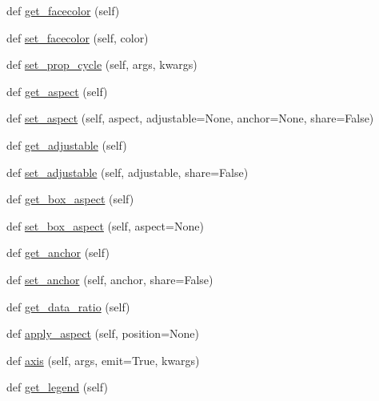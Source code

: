 \begin{DoxyCompactItemize}
def \hyperlink{classmatplotlib_1_1axes_1_1__base_1_1__AxesBase_a0e130f5d753b4ef50d33f100ec6fb068}{get\+\_\+facecolor} (self)
\item 
def \hyperlink{classmatplotlib_1_1axes_1_1__base_1_1__AxesBase_a1a87d87214f7cddc8ad8939687335a36}{set\+\_\+facecolor} (self, color)
\item 
def \hyperlink{classmatplotlib_1_1axes_1_1__base_1_1__AxesBase_a6017bb9ef43c8fea5e1ea371b12c49f0}{set\+\_\+prop\+\_\+cycle} (self, args, kwargs)
\item 
def \hyperlink{classmatplotlib_1_1axes_1_1__base_1_1__AxesBase_ae9d1763aa72778abe0791b26b1091f08}{get\+\_\+aspect} (self)
\item 
def \hyperlink{classmatplotlib_1_1axes_1_1__base_1_1__AxesBase_acab77334c3a0b4d7259b924ca5c83158}{set\+\_\+aspect} (self, aspect, adjustable=None, anchor=None, share=False)
\item 
def \hyperlink{classmatplotlib_1_1axes_1_1__base_1_1__AxesBase_af71d2d651649e9eb443889e9bddf1ff3}{get\+\_\+adjustable} (self)
\item 
def \hyperlink{classmatplotlib_1_1axes_1_1__base_1_1__AxesBase_ad1bff98b0950ad31c18e032e1de19e7e}{set\+\_\+adjustable} (self, adjustable, share=False)
\item 
def \hyperlink{classmatplotlib_1_1axes_1_1__base_1_1__AxesBase_ad02b53a54fa6d100ffec1d0d1cf2264f}{get\+\_\+box\+\_\+aspect} (self)
\item 
def \hyperlink{classmatplotlib_1_1axes_1_1__base_1_1__AxesBase_add4af0efc6b6894f19e31e5f29159916}{set\+\_\+box\+\_\+aspect} (self, aspect=None)
\item 
def \hyperlink{classmatplotlib_1_1axes_1_1__base_1_1__AxesBase_af71743e45c8fba195fa7b3c85e6457e4}{get\+\_\+anchor} (self)
\item 
def \hyperlink{classmatplotlib_1_1axes_1_1__base_1_1__AxesBase_abe1076b7fa35790ed221223197bb9929}{set\+\_\+anchor} (self, anchor, share=False)
\item 
def \hyperlink{classmatplotlib_1_1axes_1_1__base_1_1__AxesBase_abeae180562755bea23ee21637d889850}{get\+\_\+data\+\_\+ratio} (self)
\item 
def \hyperlink{classmatplotlib_1_1axes_1_1__base_1_1__AxesBase_aa084ec41dd68497e342597d4ae163e93}{apply\+\_\+aspect} (self, position=None)
\item 
def \hyperlink{classmatplotlib_1_1axes_1_1__base_1_1__AxesBase_a9c63db539d7ab6bcb071919bdfd8af8f}{axis} (self, args, emit=True, kwargs)
\item 
def \hyperlink{classmatplotlib_1_1axes_1_1__base_1_1__AxesBase_a48f9b4e962c65834674f8a08ac8cd699}{get\+\_\+legend} (self)

\end{DoxyCompactItemize}
